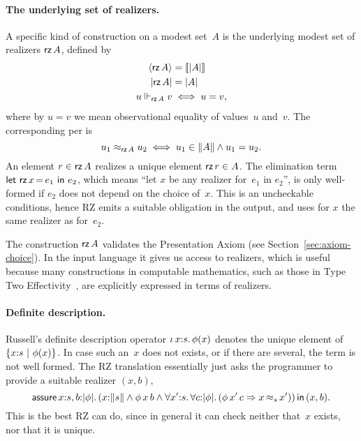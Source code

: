 \paragraph{The underlying set of realizers.}
%
A specific kind of construction on a modest set~$A$ is the underlying
modest set of realizers $\textsf{rz}\,A$, defined by
%
\begin{align*}
  \langle \textsf{rz}\,A \rangle &= [\![|A|]\!] \\
  |\textsf{rz}\,A| &= |A| \\
  u \Vdash_{\textsf{rz}\,A} v &\iff u = v,
\end{align*}
%
where by $u = v$ we mean observational equality of values~$u$ and~$v$.
The corresponding per is
%
\begin{equation*}
  u_1 \approx_{\textsf{rz}\,A} u_2 \iff u_1 \in \|A\| \land u_1 = u_2.
\end{equation*}
%
An element $r \in \textsf{rz}\,A$ realizes a unique element $\textsf{rz}\,r \in A$.
The elimination term $\textsf{let}\ \textsf{rz}\,x\,{=}\,e_1\ \textsf{in}\ e_2$, which means ``let $x$ be
any realizer for~$e_1$ in $e_2$'', is only well-formed if $e_2$ does
not depend on the choice of~$x$. This is an uncheckable conditions,
hence RZ emits a suitable obligation in the output, and uses for $x$
the same realizer as for~$e_2$.

The construction $\textsf{rz}\,A$ validates the Presentation Axiom (see
Section~\ref{sec:axiom-choice}). In the input language it gives us
access to realizers, which is useful because many constructions in
computable mathematics, such as those in Type Two
Effectivity~\cite{Wei00}, are explicitly expressed in terms of
realizers.


\paragraph{Definite description.}
%
Russell's definite description operator $\iota\,x{:}s{.}\, \phi(x)$ denotes
the unique element of $\{x{:}s\ |\ \phi(x)\}$. In case such an~$x$
does not exists, or if there are several, the term is not well formed.
The RZ translation essentially just asks the programmer to provide a
suitable realizer $(x,b)$,
%
\begin{equation*}
  \ooblig{x{:}s,b}{\typeOf{\phi}}{
    (\ototal{x}{s} \land \oapp{\oapp{\phi}{x}}{b} \land
    \oforall{x'}{s}{
      \oforall{c}{\typeOf{\phi}}{
        (\oimply{\oapp{\oapp{\phi}{x'}}{c}}{\oper{s}{x}{x'}})
      }
    })
    }{(x,b)}.
\end{equation*}
%
This is the best RZ can do, since in general it can check neither
that~$x$ exists, nor that it is unique.


